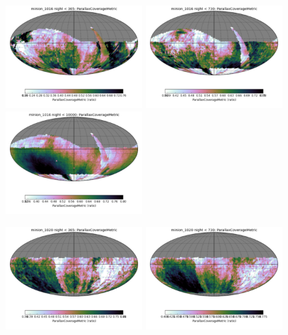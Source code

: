 \begin{figure}[ht]
  \begin{center}
  \includegraphics[width=2.0in]{./figs/milkyway/astromPanels/MW_Astrom_paCovge_Baseline_01y_map.png}
  \includegraphics[width=2.0in]{./figs/milkyway/astromPanels/MW_Astrom_paCovge_Baseline_02y_map.png}
  \includegraphics[width=2.0in]{./figs/milkyway/astromPanels/MW_Astrom_paCovge_Baseline_10y_map.png}
  \end{center}
  \begin{center}
  \includegraphics[width=2.0in]{./figs/milkyway/astromPanels/MW_Astrom_paCovge_PanSTARRS_01y_map.png}
  \includegraphics[width=2.0in]{./figs/milkyway/astromPanels/MW_Astrom_paCovge_PanSTARRS_02y_map.png}

\end{center}
\end{figure}
